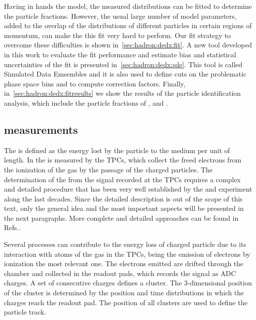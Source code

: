 Having in hands the \dedx model, the measured \dedx
distributions can be fitted to determine the particle
fractions. However, the usual large number of
model parameters, added to the
overlap of the \dedx distributions
of different particles in certain regions of momentum,
can make the this fit very hard to perform.
Our fit strategy to overcome these difficulties is shown
in~\cref{sec:hadron:dedx:fit}. A new tool
developed in this work to evaluate the fit performance
and estimate bias and statistical uncertainties of the fit
is presented in~\cref{sec:hadron:dedx:sde}. This
tool is called Simulated Data Emsembles and
it is also used to define cuts on the problematic
phase space bins and to compute correction factors.
Finally, in~\cref{sec:hadron:dedx:fitresults} we show the results
of the particle identification analysis, which include
the particle fractions of \pions, \kaons and \protons.


\subsection{\dedx measurements}
\label{sec:hadron:dedx:meas}


The \dedx is defined as the energy lost by the
particle to the medium per unit of length. 
In \NASixtyOne the \dedx is measured by the TPCs, which collect the 
freed electrons from the ionization of the gas by the passage of the charged particles.
The determination of the \dedx from the signal recorded at the TPCs requires a complex and
detailed procedure that has been very well established by the \NAFortyNine and \NASixtyOne
experiment along the last decades. Since the detailed description 
is out of the scope of this text, only the general idea and the most important aspects
will be presented in the next paragraphs. More complete and detailed approaches
can be found in Refs.\cite{BlumBook,LeeuwenThesis,GaborVeresThesis}.

Several processes can contribute to the energy loss of charged particle due to
its interaction with atoms of the gas in the TPCs, being the emission of
electrons by ionization the most relevant one. The electrons emitted are
drifted through the chamber and collected in the readout pads, which records
the signal as ADC charges. A set of consecutive charges defines a cluster.
The 3-dimensional position of the cluster is determined by the position
and time distributions in which the charges reach the readout pad.
The position of all clusters are used to define the particle track.

